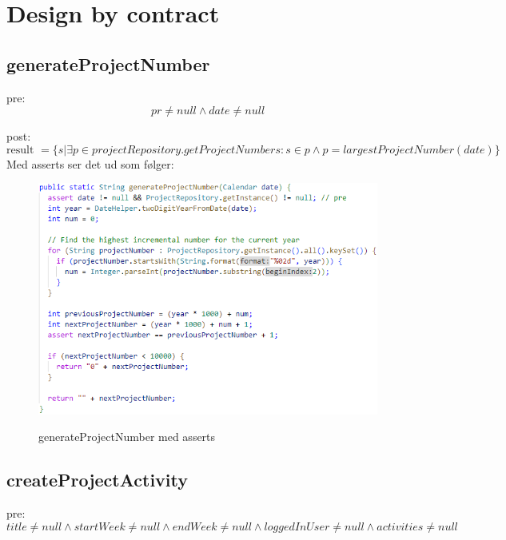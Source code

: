 \section{Design by contract}

\subsection{generateProjectNumber}
pre: 
\begin{equation}
    pr \neq null \land date \neq null
\end{equation}

post:
\begin{equation}
    \text{result }=\{s|\exists p \in projectRepository.getProjectNumbers : s \in p \land p = largestProjectNumber(date)\}
\end{equation}
Med asserts ser det ud som følger:
\begin{figure}[H]
    \centering
    \caption{generateProjectNumber med asserts}
    \includegraphics[width = 14cm, keepaspectratio]{ImplementationAndTest/Diagrams/contract_generateProjectNumber.png}
    \label{fig:contract_generateProjectNumber}
\end{figure}




\subsection{createProjectActivity}
pre: 
\begin{equation}
    title \neq null \wedge startWeek \neq null \wedge endWeek \neq null \wedge loggedInUser \neq null \wedge activities \neq null
\end{equation}

